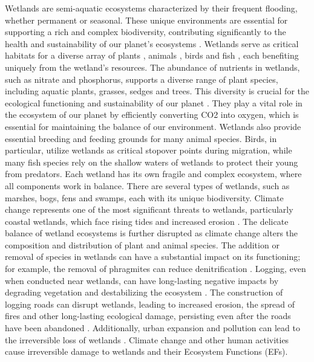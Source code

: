 \documentclass[12pt,letterpaper]{article}
\begin{document}
Wetlands are semi-aquatic ecosystems characterized by their frequent flooding, whether permanent or seasonal.
These unique environments are essential for supporting a rich and complex biodiversity, contributing significantly to the health and sustainability of our planet's ecosystems \cite{junk2006comparative}.
Wetlands serve as critical habitats for a diverse array of plants \cite{pott2011plant}, animals \cite{wetlands_conservancy}, birds \cite{kavcergyte2021evaluating} and fish \cite{das2018fish}, each benefiting uniquely from the wetland's resources.
The abundance of nutrients in wetlands, such as nitrate and phosphorus, supports a diverse range of plant species, including aquatic plants, grasses, sedges and trees.
This diversity is crucial for the ecological functioning and sustainability of our planet \cite{grime1998benefits}.
They play a vital role in the ecosystem of our planet by efficiently converting CO2 into oxygen, which is essential for maintaining the balance of our environment.
Wetlands also provide essential breeding and feeding grounds for many animal species.
Birds, in particular, utilize wetlands as critical stopover points during migration, while many fish species rely on the shallow waters of wetlands to protect their young from predators.
Each wetland has its own fragile and complex ecosystem, where all components work in balance.
There are several types of wetlands, such as marshes, bogs, fens and swamps, each with its unique biodiversity.
Climate change represents one of the most significant threats to wetlands, particularly coastal wetlands, which face rising tides and increased erosion \cite{wa_ecology_wetlands_climate_change}.
The delicate balance of wetland ecosystems is further disrupted as climate change alters the composition and distribution of plant and animal species.
The addition or removal of species in wetlands can have a substantial impact on its functioning; for example, the removal of phragmites can reduce denitrification \cite{alldred2016effects}.
Logging, even when conducted near wetlands, can have long-lasting negative impacts by degrading vegetation and destabilizing the ecosystem \cite{batzer2000influences}.
The construction of logging roads can disrupt wetlands, leading to increased erosion, the spread of fires and other long-lasting ecological damage, persisting even after the roads have been abandoned \cite{kleinschroth2017impacts}.
Additionally, urban expansion and pollution can lead to the irreversible loss of wetlands \cite{mao2018china,li2022heavy}.
Climate change and other human activities cause irreversible damage to wetlands and their Ecosystem Functions (\ac{EF}s).
\end{document}
